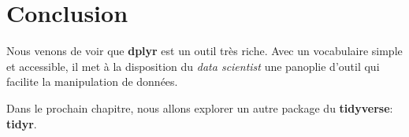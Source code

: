\documentclass[]{book}
\begin{document}
\section{Conclusion}\label{conclusion-1}

Nous venons de voir que \textbf{dplyr} est un outil très riche. Avec un
vocabulaire simple et accessible, il met à la disposition du \emph{data
scientist} une panoplie d'outil qui facilite la manipulation de données.

Dans le prochain chapitre, nous allons explorer un autre package du
\textbf{tidyverse}: \textbf{tidyr}.


\end{document}
